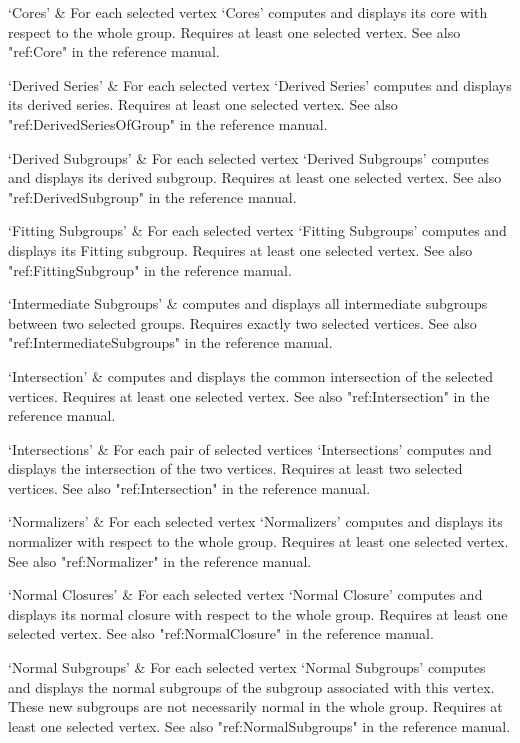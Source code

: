 `Cores' &
For each selected vertex `Cores' computes and displays its core with
respect to the whole group.  Requires at least one selected vertex. See
also "ref:Core" in the {\GAP}
reference manual.

`Derived Series' &
For   each  selected vertex  `Derived  Series'  computes and displays its
derived series.   Requires  at   least  one selected vertex.    See  also
"ref:DerivedSeriesOfGroup" in the {\GAP}
reference manual.

`Derived Subgroups' &
For each selected vertex `Derived Subgroups' computes and displays its
derived subgroup.  Requires at least one selected vertex.  See also
"ref:DerivedSubgroup" in the {\GAP}
reference manual.

`Fitting Subgroups' &
For each selected vertex `Fitting Subgroups' computes and displays its
Fitting subgroup.  Requires at least one selected vertex.  See also
"ref:FittingSubgroup" in the {\GAP}
reference manual.

`Intermediate Subgroups' &
computes and displays all intermediate subgroups between two selected
groups. Requires exactly two selected vertices. See also
"ref:IntermediateSubgroups" in the {\GAP}
reference manual. 

`Intersection' &
computes and displays the common intersection of the selected vertices.
Requires at least one selected vertex.  See also "ref:Intersection" in the
{\GAP} reference manual.

`Intersections' &
For each pair of selected vertices `Intersections' computes and displays
the intersection of the two vertices.  Requires at least two selected
vertices.  See also "ref:Intersection" in the {\GAP}
reference manual.

`Normalizers' &
For each selected vertex `Normalizers' computes and displays its normalizer
with respect to the whole group.  Requires at least one selected vertex.
See also "ref:Normalizer" in the {\GAP}
reference manual.

`Normal Closures' &
For each selected vertex `Normal Closure' computes and displays its normal
closure with respect to the whole group.  Requires at least one selected
vertex.  See also "ref:NormalClosure" in the {\GAP}
reference manual.

`Normal Subgroups' &
For   each selected vertex `Normal  Subgroups'  computes and displays the
normal subgroups of the subgroup associated  with this vertex.  These new
subgroups are not  necessarily  normal in the  whole  group.  Requires at
least one selected vertex.  See also "ref:NormalSubgroups" in the {\GAP}
reference manual.

